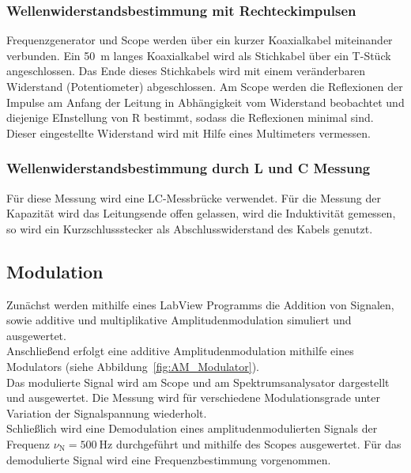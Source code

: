 \documentclass[a4paper,twoside,final]{article}
\begin{document}
\subsubsection{Wellenwiderstandsbestimmung mit Rechteckimpulsen}\label{subsec:BestimmungZL}
Frequenzgenerator und Scope werden über ein kurzer Koaxialkabel miteinander verbunden. Ein \SI{50}{\metre} langes Koaxialkabel wird als Stichkabel über ein T-Stück angeschlossen. Das Ende dieses Stichkabels wird mit einem veränderbaren Widerstand (Potentiometer) abgeschlossen. Am Scope werden die Reflexionen der Impulse am Anfang der Leitung in Abhängigkeit vom Widerstand beobachtet und diejenige EInstellung von R bestimmt, sodass die Reflexionen minimal sind. Dieser eingestellte Widerstand wird mit Hilfe eines Multimeters vermessen.

\subsubsection{Wellenwiderstandsbestimmung durch L und C Messung}
Für diese Messung wird eine LC-Messbrücke verwendet. Für die Messung der Kapazität wird das Leitungsende offen gelassen, wird die Induktivität gemessen, so wird ein Kurzschlussstecker als Abschlusswiderstand des Kabels genutzt.

\subsection{Modulation}
Zunächst werden mithilfe eines LabView Programms die Addition von Signalen, sowie additive und multiplikative Amplitudenmodulation simuliert und ausgewertet.\\
Anschließend erfolgt eine additive Amplitudenmodulation mithilfe eines Modulators (siehe Abbildung~\ref{fig:AM_Modulator}).\\
Das modulierte Signal wird am Scope und am Spektrumsanalysator dargestellt und ausgewertet. Die Messung wird für verschiedene Modulationsgrade unter Variation der Signalspannung wiederholt.\\
Schließlich wird eine Demodulation eines amplitudenmodulierten Signals der Frequenz $\nu_\text{N} = \SI{500}{\hertz}$ durchgeführt und mithilfe des Scopes ausgewertet. Für das demodulierte Signal wird eine Frequenzbestimmung vorgenommen.
\end{document}
